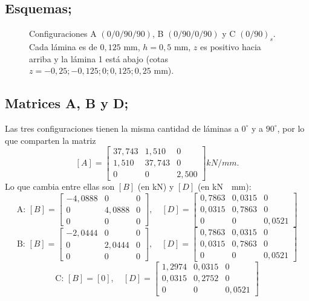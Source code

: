 \documentclass[11pt,a4paper]{article}
\newcommand{\kNmm}{\si{kN/mm}}
\newcommand{\kNmmm}{\si{kN\cdot mm}}
\begin{document}
\subsection{Esquemas;}
\begin{figure}[H]
\centering
{}
\caption{Configuraciones A $(0/0/90/90)$, B $(0/90/0/90)$ y C $(0/90)_s$. Cada lámina es de $0{,}125$ mm, $h=0{,}5$ mm, $z$ es positivo hacia arriba y la lámina 1 está abajo (cotas $z=-0{,}25;-0{,}125;0;0{,}125;0{,}25$ mm).}
\end{figure}

\subsection{Matrices A, B y D;}
Las tres configuraciones tienen la misma cantidad de láminas a $0^\circ$ y a $90^\circ$, por lo que comparten la matriz
\[
[A]=\begin{bmatrix}37{,}743&1{,}510&0\\1{,}510&37{,}743&0\\0&0&2{,}500\end{bmatrix}\kNmm .
\]
Lo que cambia entre ellas son $[B]$ (en \si{kN}) y $[D]$ (en \kNmmm):
\[
\text{A: }[B]=\begin{bmatrix}-4{,}0888&0&0\\0&4{,}0888&0\\0&0&0\end{bmatrix},\quad
[D]=\begin{bmatrix}0{,}7863&0{,}0315&0\\0{,}0315&0{,}7863&0\\0&0&0{,}0521\end{bmatrix}
\]
\[
\text{B: }[B]=\begin{bmatrix}-2{,}0444&0&0\\0&2{,}0444&0\\0&0&0\end{bmatrix},\quad
[D]=\begin{bmatrix}0{,}7863&0{,}0315&0\\0{,}0315&0{,}7863&0\\0&0&0{,}0521\end{bmatrix}
\]
\[
\text{C: }[B]=[0],\quad
[D]=\begin{bmatrix}1{,}2974&0{,}0315&0\\0{,}0315&0{,}2752&0\\0&0&0{,}0521\end{bmatrix}
\]
\end{document}

